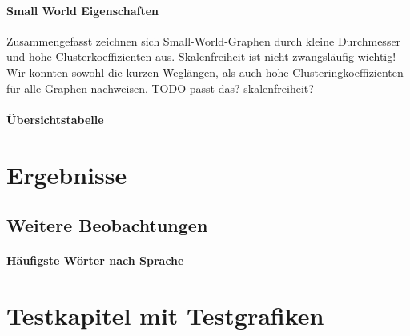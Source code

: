 \documentclass[12pt, a4paper]{article}
\begin{document}
\paragraph{Small World Eigenschaften}
Zusammengefasst zeichnen sich Small-World-Graphen durch kleine Durchmesser und
hohe Clusterkoeffizienten aus. Skalenfreiheit ist nicht zwangsläufig wichtig!
Wir konnten sowohl die kurzen Weglängen, als auch hohe Clusteringkoeffizienten
für alle Graphen nachweisen. TODO passt das? skalenfreiheit? 


\paragraph{Übersichtstabelle}
\section{Ergebnisse}
\subsection{Weitere Beobachtungen}
\paragraph{H\"aufigste W\"orter nach Sprache}

\section{Testkapitel mit Testgrafiken}
\end{document}
